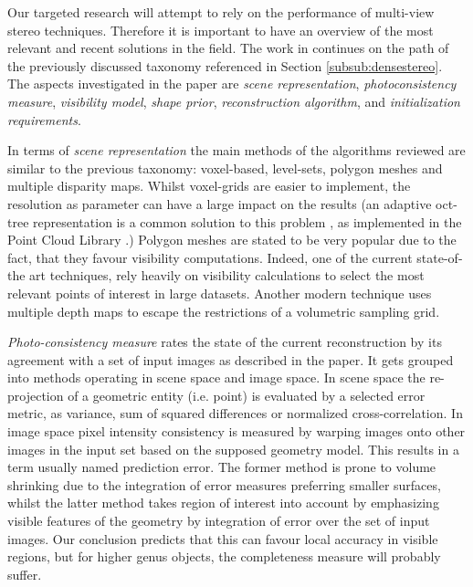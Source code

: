 \documentclass{ucl_thesis}
\begin{document}
Our targeted research will attempt to rely on the performance of multi-view stereo techniques. Therefore it is important to have an overview of the most relevant and recent solutions in the field. The work in \cite{Seitz:2006} continues on the path of the previously discussed taxonomy referenced in Section \ref{subsub:densestereo}. The aspects investigated in the paper are {\it scene representation}, {\it photoconsistency measure}, {\it visibility model}, \textit{shape prior}, \textit{reconstruction algorithm}, and {\it initialization requirements}.

\par In terms of {\it scene representation} the main methods of the algorithms reviewed are similar to the previous taxonomy: voxel-based, level-sets, polygon meshes and multiple disparity maps. Whilst voxel-grids are easier to implement, the resolution as parameter can have a large impact on the results (an adaptive oct-tree representation is a common solution to this problem \cite{jevans1989adaptive}, as implemented in the Point Cloud Library \cite{PCL}.) Polygon meshes are stated to be very popular due to the fact, that they favour visibility computations. Indeed, one of the current state-of-the art techniques, \cite{FurukawaCSS10} rely heavily on visibility calculations to select the most relevant points of interest in large datasets. Another modern technique \cite{Tola12} uses multiple depth maps to escape the restrictions of a volumetric sampling grid.

\par {\it Photo-consistency measure} rates the state of the current reconstruction by its agreement with a set of input images as described in the paper. It gets grouped into methods operating in scene space and image space. In scene space the re-projection of a geometric entity (i.e. point) is evaluated by a selected error metric, as variance, sum of squared differences or normalized cross-correlation. In image space pixel intensity consistency is measured by warping images onto other images in the input set based on the supposed geometry model. This results in a term usually named prediction error. The former method is prone to volume shrinking due to the integration of error measures preferring smaller surfaces, whilst the latter method takes region of interest into account by emphasizing visible features of the geometry by integration of error over the set of input images. Our conclusion predicts that this can favour local accuracy in visible regions, but for higher genus objects, the completeness measure will probably suffer.
\end{document}
